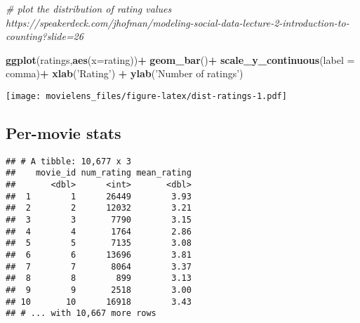 \documentclass[
]{article}
\newenvironment{Shaded}{\begin{snugshade}}{\end{snugshade}}
\newcommand{\CommentTok}[1]{\textcolor[rgb]{0.56,0.35,0.01}{\textit{#1}}}
\newcommand{\DataTypeTok}[1]{\textcolor[rgb]{0.13,0.29,0.53}{#1}}
\newcommand{\KeywordTok}[1]{\textcolor[rgb]{0.13,0.29,0.53}{\textbf{#1}}}
\newcommand{\NormalTok}[1]{#1}
\newcommand{\OperatorTok}[1]{\textcolor[rgb]{0.81,0.36,0.00}{\textbf{#1}}}
\newcommand{\StringTok}[1]{\textcolor[rgb]{0.31,0.60,0.02}{#1}}
\begin{document}
\begin{Shaded}
\begin{Highlighting}[]
\CommentTok{# plot the distribution of rating values https://speakerdeck.com/jhofman/modeling-social-data-lecture-2-introduction-to-counting?slide=26}

\KeywordTok{ggplot}\NormalTok{(ratings,}\KeywordTok{aes}\NormalTok{(}\DataTypeTok{x=}\NormalTok{rating))}\OperatorTok{+}
\StringTok{  }\KeywordTok{geom_bar}\NormalTok{()}\OperatorTok{+}
\StringTok{  }\KeywordTok{scale_y_continuous}\NormalTok{(}\DataTypeTok{label =}\NormalTok{ comma)}\OperatorTok{+}
\StringTok{  }\KeywordTok{xlab}\NormalTok{(}\StringTok{'Rating'}\NormalTok{) }\OperatorTok{+}
\StringTok{  }\KeywordTok{ylab}\NormalTok{(}\StringTok{'Number of ratings'}\NormalTok{)}
\end{Highlighting}
\end{Shaded}

\texttt{[image: movielens\_files/figure-latex/dist-ratings-1.pdf]}

\hypertarget{per-movie-stats}{%
\subsection{Per-movie stats}\label{per-movie-stats}}

\begin{Shaded}
\end{Shaded}

\begin{verbatim}
## # A tibble: 10,677 x 3
##    movie_id num_rating mean_rating
##       <dbl>      <int>       <dbl>
##  1        1      26449        3.93
##  2        2      12032        3.21
##  3        3       7790        3.15
##  4        4       1764        2.86
##  5        5       7135        3.08
##  6        6      13696        3.81
##  7        7       8064        3.37
##  8        8        899        3.13
##  9        9       2518        3.00
## 10       10      16918        3.43
## # ... with 10,667 more rows
\end{verbatim}
\end{document}
